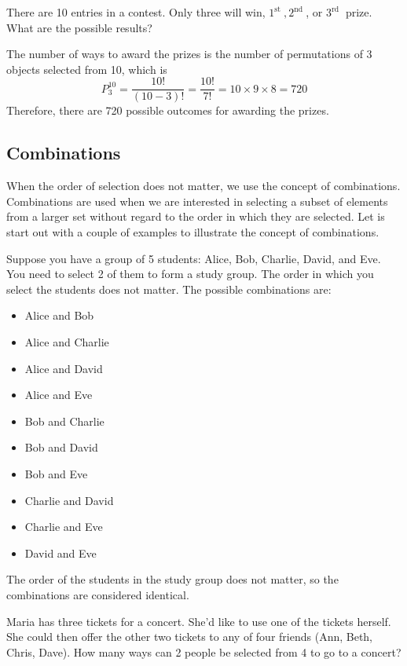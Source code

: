 \begin{example}
    There are 10 entries in a contest. Only three will win, $1^{\text {st }}, 2^{\text {nd }}$, or $3^{\text {rd }}$ prize. What are the possible results?
\end{example}
\begin{solution}
    The number of ways to award the prizes is the number of permutations of 3 objects selected from 10, which is
    \[
    P_3^{10}= \frac{10!}{(10-3)!}=\frac{10!}{7!} = 10 \times 9 \times 8 = 720
    \]
    Therefore, there are 720 possible outcomes for awarding the prizes.
\end{solution}

\subsection*{Combinations}

When the order of selection does not matter, we use the concept of combinations. Combinations are used when we are interested in selecting a subset of elements from a larger set without regard to the order in which they are selected. Let is start out with a couple of examples to illustrate the concept of combinations.

\begin{example}
    Suppose you have a group of 5 students: Alice, Bob, Charlie, David, and Eve. You need to select 2 of them to form a study group. The order in which you select the students does not matter. The possible combinations are:
    \begin{itemize}
        \item Alice and Bob
        \item Alice and Charlie
        \item Alice and David
        \item Alice and Eve
        \item Bob and Charlie
        \item Bob and David
        \item Bob and Eve
        \item Charlie and David
        \item Charlie and Eve
        \item David and Eve
    \end{itemize}
    The order of the students in the study group does not matter, so the combinations are considered identical.
\end{example}

\begin{example}
    Maria has three tickets for a concert. She'd like to use one of the tickets herself. She could then offer the other two tickets to any of four friends (Ann, Beth, Chris, Dave). How many ways can 2 people be selected from 4 to go to a concert?
\end{example}

